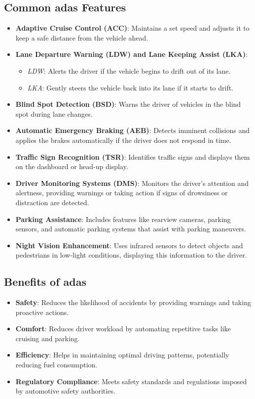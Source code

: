 \subsection*{Common \ac{adas} Features}
\begin{itemize}
    \item \textbf{Adaptive Cruise Control (ACC)}:
    Maintains a set speed and adjusts it to keep a safe distance from the vehicle ahead.
    \item \textbf{Lane Departure Warning (LDW) and Lane Keeping Assist (LKA)}:
    \begin{itemize}
        \item \textit{LDW}: Alerts the driver if the vehicle begins to drift out of its lane.
        \item \textit{LKA}: Gently steers the vehicle back into its lane if it starts to drift.
    \end{itemize}
    \item \textbf{Blind Spot Detection (BSD)}:
    Warns the driver of vehicles in the blind spot during lane changes.
    \item \textbf{Automatic Emergency Braking (AEB)}:
    Detects imminent collisions and applies the brakes automatically if the driver does not respond in time.
    \item \textbf{Traffic Sign Recognition (TSR)}:
    Identifies traffic signs and displays them on the dashboard or head-up display.
    \item \textbf{Driver Monitoring Systems (DMS)}:
    Monitors the driver’s attention and alertness, providing warnings or taking action if signs of drowsiness or distraction are detected.
    \item \textbf{Parking Assistance}:
    Includes features like rearview cameras, parking sensors, and automatic parking systems that assist with parking maneuvers.
    \item \textbf{Night Vision Enhancement}:
    Uses infrared sensors to detect objects and pedestrians in low-light conditions, displaying this information to the driver.
\end{itemize}
%
\subsection*{Benefits of \ac{adas}}
\begin{itemize}
    \item \textbf{Safety}: Reduces the likelihood of accidents by providing warnings and taking proactive actions.
    \item \textbf{Comfort}: Reduces driver workload by automating repetitive tasks like cruising and parking.
    \item \textbf{Efficiency}: Helps in maintaining optimal driving patterns, potentially reducing fuel consumption.
    \item \textbf{Regulatory Compliance}: Meets safety standards and regulations imposed by automotive safety authorities.
\end{itemize}
%
